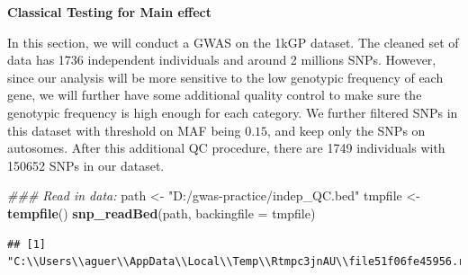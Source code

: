 \documentclass[
]{article}
\newenvironment{Shaded}{\begin{snugshade}}{\end{snugshade}}
\newcommand{\CommentTok}[1]{\textcolor[rgb]{0.56,0.35,0.01}{\textit{#1}}}
\newcommand{\DataTypeTok}[1]{\textcolor[rgb]{0.13,0.29,0.53}{#1}}
\newcommand{\DecValTok}[1]{\textcolor[rgb]{0.00,0.00,0.81}{#1}}
\newcommand{\KeywordTok}[1]{\textcolor[rgb]{0.13,0.29,0.53}{\textbf{#1}}}
\newcommand{\NormalTok}[1]{#1}
\newcommand{\OperatorTok}[1]{\textcolor[rgb]{0.81,0.36,0.00}{\textbf{#1}}}
\newcommand{\StringTok}[1]{\textcolor[rgb]{0.31,0.60,0.02}{#1}}
\begin{document}
\textbf{Classical Testing for Main effect}

In this section, we will conduct a GWAS on the 1kGP dataset. The cleaned
set of data has 1736 independent individuals and around 2 millions SNPs.
However, since our analysis will be more sensitive to the low genotypic
frequency of each gene, we will further have some additional quality
control to make sure the genotypic frequency is high enough for each
category. We further filtered SNPs in this dataset with threshold on MAF
being \(0.15\), and keep only the SNPs on autosomes. After this
additional QC procedure, there are 1749 individuals with 150652 SNPs in
our dataset.

\begin{Shaded}
\begin{Highlighting}[]
\CommentTok{### Read in data:}
\NormalTok{path <-}\StringTok{ "D:/gwas-practice/indep_QC.bed"}
\NormalTok{tmpfile  <-}\StringTok{ }\KeywordTok{tempfile}\NormalTok{()}
\KeywordTok{snp_readBed}\NormalTok{(path, }\DataTypeTok{backingfile =}\NormalTok{ tmpfile)}
\end{Highlighting}
\end{Shaded}

\begin{verbatim}
## [1] "C:\\Users\\aguer\\AppData\\Local\\Temp\\Rtmpc3jnAU\\file51f06fe45956.rds"
\end{verbatim}

\begin{Shaded}
\end{Shaded}
\end{document}
